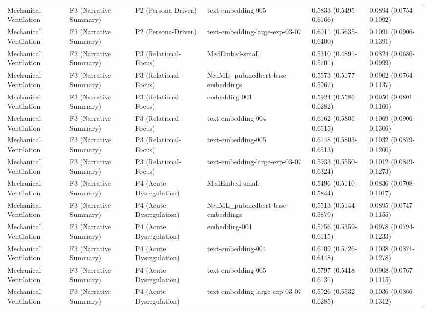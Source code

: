 \documentclass[border=0pt]{standalone}
\begin{document}
\begin{adjustbox}{width=\textwidth}
\begin{tabular}{llllll}
Mechanical Ventilation & F3 (Narrative Summary) & P2 (Persona-Driven) & text-embedding-005 & 0.5833 (0.5495-0.6166) & 0.0894 (0.0754-0.1092) \\
Mechanical Ventilation & F3 (Narrative Summary) & P2 (Persona-Driven) & text-embedding-large-exp-03-07 & 0.6011 (0.5635-0.6400) & 0.1091 (0.0906-0.1391) \\
Mechanical Ventilation & F3 (Narrative Summary) & P3 (Relational-Focus) & MedEmbed-small & 0.5310 (0.4891-0.5701) & 0.0824 (0.0686-0.0999) \\
Mechanical Ventilation & F3 (Narrative Summary) & P3 (Relational-Focus) & NeuML\_pubmedbert-base-embeddings & 0.5573 (0.5177-0.5967) & 0.0902 (0.0764-0.1137) \\
Mechanical Ventilation & F3 (Narrative Summary) & P3 (Relational-Focus) & embedding-001 & 0.5924 (0.5586-0.6282) & 0.0950 (0.0801-0.1166) \\
Mechanical Ventilation & F3 (Narrative Summary) & P3 (Relational-Focus) & text-embedding-004 & 0.6162 (0.5805-0.6515) & 0.1069 (0.0906-0.1306) \\
Mechanical Ventilation & F3 (Narrative Summary) & P3 (Relational-Focus) & text-embedding-005 & 0.6148 (0.5803-0.6513) & 0.1032 (0.0879-0.1260) \\
Mechanical Ventilation & F3 (Narrative Summary) & P3 (Relational-Focus) & text-embedding-large-exp-03-07 & 0.5933 (0.5550-0.6324) & 0.1012 (0.0849-0.1273) \\
Mechanical Ventilation & F3 (Narrative Summary) & P4 (Acute Dysregulation) & MedEmbed-small & 0.5496 (0.5110-0.5844) & 0.0836 (0.0708-0.1017) \\
Mechanical Ventilation & F3 (Narrative Summary) & P4 (Acute Dysregulation) & NeuML\_pubmedbert-base-embeddings & 0.5513 (0.5144-0.5879) & 0.0895 (0.0747-0.1155) \\
Mechanical Ventilation & F3 (Narrative Summary) & P4 (Acute Dysregulation) & embedding-001 & 0.5756 (0.5359-0.6115) & 0.0978 (0.0794-0.1233) \\
Mechanical Ventilation & F3 (Narrative Summary) & P4 (Acute Dysregulation) & text-embedding-004 & 0.6109 (0.5726-0.6448) & 0.1038 (0.0871-0.1278) \\
Mechanical Ventilation & F3 (Narrative Summary) & P4 (Acute Dysregulation) & text-embedding-005 & 0.5797 (0.5418-0.6131) & 0.0908 (0.0767-0.1115) \\
Mechanical Ventilation & F3 (Narrative Summary) & P4 (Acute Dysregulation) & text-embedding-large-exp-03-07 & 0.5926 (0.5532-0.6285) & 0.1036 (0.0866-0.1312) \\

\end{tabular}
\end{adjustbox}
\end{document}
